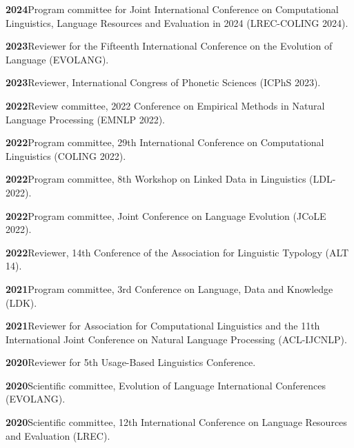 \documentclass[11pt]{article}
\newcommand{\hangpara}{
 \setlength{\parindent}{0in} %
 \hangindent=0.42in %
}
\begin{document}
\hangpara
\vskip 6pt
{\bf 2024}\hspace{1ex}Program committee for Joint International Conference on Computational Linguistics, Language Resources and Evaluation in 2024 (LREC-COLING 2024).

\hangpara
\vskip 6pt
{\bf 2023}\hspace{1ex}Reviewer for the Fifteenth International Conference on the Evolution of Language (EVOLANG).

\hangpara
\vskip 6pt
{\bf 2023}\hspace{1ex}Reviewer, International Congress of Phonetic Sciences (ICPhS 2023).

\hangpara
\vskip 6pt
{\bf 2022}\hspace{1ex}Review committee, 2022 Conference on Empirical Methods in Natural Language Processing (EMNLP 2022).

\hangpara
\vskip 6pt
{\bf 2022}\hspace{1ex}Program committee, 29th International Conference on Computational Linguistics (COLING 2022).

\hangpara
\vskip 6pt
{\bf 2022}\hspace{1ex}Program committee, 8th Workshop on Linked Data in Linguistics (LDL-2022).

\hangpara
\vskip 6pt
{\bf 2022}\hspace{1ex}Program committee, Joint Conference on Language Evolution (JCoLE 2022).

\hangpara
\vskip 6pt
{\bf 2022}\hspace{1ex}Reviewer, 14th Conference of the Association for Linguistic Typology (ALT 14).

\hangpara
\vskip 6pt
{\bf 2021}\hspace{1ex}Program committee, 3rd Conference on Language, Data and Knowledge (LDK).

\hangpara
\vskip 6pt
{\bf 2021}\hspace{1ex}Reviewer for Association for Computational Linguistics and the 11th International Joint Conference on Natural Language Processing (ACL-IJCNLP).

\vskip 6pt
\hangpara
{\bf 2020}\hspace{1ex}Reviewer for 5th Usage-Based Linguistics Conference.

\vskip 6pt
\hangpara
{\bf 2020}\hspace{1ex}Scientific committee, Evolution of Language International Conferences (EVOLANG).

\vskip 6pt
\hangpara
{\bf 2020}\hspace{1ex}Scientific committee, 12th International Conference on Language Resources and Evaluation (LREC).
\end{document}
